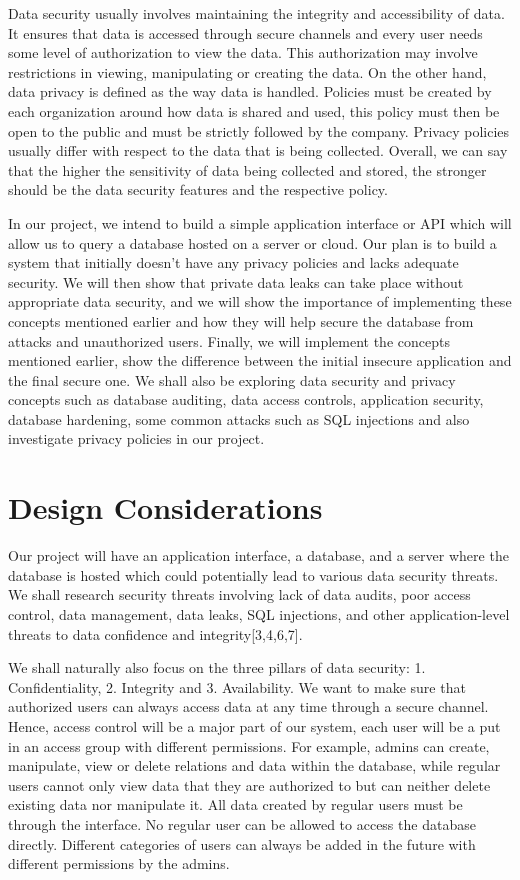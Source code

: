 \documentclass[sigconf]{acmart}
\begin{document}
Data security usually involves maintaining the integrity and accessibility of data. It ensures that data is accessed through secure channels and every user needs some level of authorization to view the data. This authorization may involve restrictions in viewing, manipulating or creating the data. On the other hand, data privacy is defined as the way data is handled. Policies must be created by each organization around how data is shared and used, this policy must then be open to the public and must be strictly followed by the company. Privacy policies usually differ with respect to the data that is being collected. Overall, we can say that the higher the sensitivity of data being collected and stored, the stronger should be the data security features and the respective policy. 

In our project, we intend to build a simple application interface or API which will allow us to query a database hosted on a server or cloud. Our plan is to build a system that initially doesn't have any privacy policies and lacks adequate security. We will then show that private data leaks can take place without appropriate data security, and we will show the importance of implementing these concepts mentioned earlier and how they will help secure the database from attacks and unauthorized users. Finally, we will implement the concepts mentioned earlier, show the difference between the initial insecure application and the final secure one. We shall also be exploring data security and privacy concepts such as database auditing, data access controls, application security, database hardening, some common attacks such as SQL injections and also investigate privacy policies in our project.

\section{Design Considerations}

Our project will have an application interface, a database, and a server where the database is hosted which could potentially lead to various data security threats. We shall research security threats involving lack of data audits, poor access control, data management, data leaks, SQL injections, and other application-level threats to data confidence and integrity[3,4,6,7]. 

We shall naturally also focus on the three pillars of data security: 1. Confidentiality, 2. Integrity and 3. Availability. We want to make sure that authorized users can always access data at any time through a secure channel. Hence, access control will be a major part of our system, each user will be a put in an access group with different permissions. For example, admins can create, manipulate, view or delete relations and data within the database, while regular users cannot only view data that they are authorized to but can neither delete existing data nor manipulate it. All data created by regular users must be through the interface. No regular user can be allowed to access the database directly. Different categories of users can always be added in the future with different permissions by the admins. 
\end{document}
